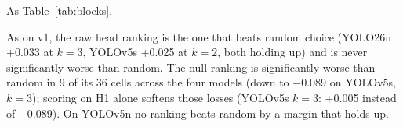 \documentclass[10pt]{article}
\newcommand{\tnote}[1]{\par\vspace{3pt}\begin{minipage}{\linewidth}\footnotesize #1\end{minipage}}  %
\newcommand{\tbl}[1]{\adjustbox{max width=\linewidth}{}}
\begin{document}
\begin{table}[H]
\centering\small
\caption{From scratch, Viewsphere v2: accuracy of each ranking's cut, YOLOv5}
\tbl{blocks_v5_vs2_scratch}
\tnote{As Table~\ref{tab:blocks}.}
\end{table}

As on v1, the raw head ranking is the one that beats random choice (YOLO26n +0.033 at $k = 3$, YOLOv5s
+0.025 at $k = 2$, both holding up) and is never significantly worse than random. The null ranking is
significantly worse than random in 9 of its 36 cells across the four models (down to $-$0.089 on
YOLOv5s, $k = 3$); scoring on H1 alone softens those losses (YOLOv5s $k = 3$: +0.005 instead of
$-$0.089). On YOLOv5n no ranking beats random by a margin that holds up.
\end{document}
